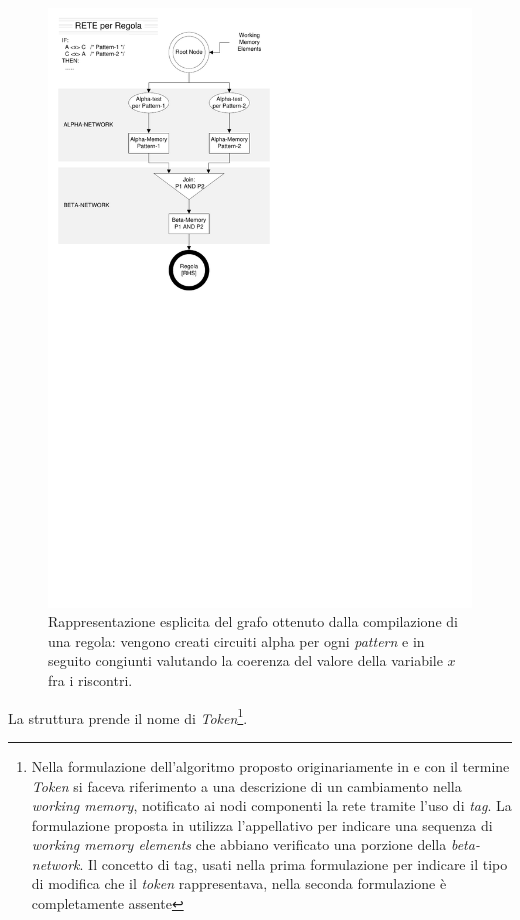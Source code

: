\begin{figure}
\centering
\includegraphics[viewport=14 446 312 829]{Immagini/Capitolo1/RETE-regola.pdf}
\caption{Rappresentazione esplicita del grafo ottenuto dalla compilazione di una regola: vengono creati circuiti alpha per ogni \emph{pattern} e in seguito congiunti valutando la coerenza del valore della variabile $x$ fra i riscontri.}\label{fig:grafo-regola}
\end{figure}


La struttura prende il nome di \emph{Token}\footnote{Nella formulazione dell'algoritmo proposto originariamente in \cite{forgy1979} e \cite{forgy1982} con il termine \emph{Token} si faceva riferimento a una descrizione di un cambiamento nella \emph{working memory}, notificato ai nodi componenti la rete tramite l'uso di \emph{tag}. La formulazione proposta in \cite{Doorenbos95productionmatching} utilizza l'appellativo per indicare una sequenza di \emph{working memory elements} che abbiano verificato una porzione della \emph{beta-network}. Il concetto di tag, usati nella prima formulazione per indicare il tipo di modifica che il \emph{token} rappresentava, nella seconda formulazione è completamente assente}.

